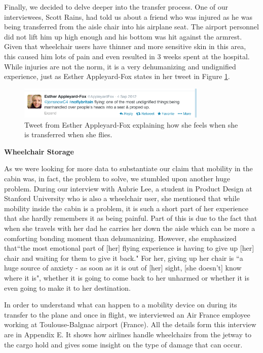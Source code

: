 Finally, we decided to delve deeper into the transfer process. One of our interviewees, Scott Rains, had told us about a friend who was injured as he was being transferred from the aisle chair into his airplane seat. The airport personnel did not lift him up high enough and his bottom was hit against the armrest. Given that wheelchair users have thinner and more sensitive skin in this area, this caused him lots of pain and even resulted in 3 weeks spent at the hospital. While injuries are not the norm, it is a very dehumanizing and undignified experience, just as Esther Appleyard-Fox states in her tweet in Figure \ref{fig:MobilityTweet.png}. 


\begin{figure}[h]
  \centering
     \includegraphics[width=9cm]{images/MobilityTweet.png}
   \caption{Tweet from Esther Appleyard-Fox explaining how she feels when she is transferred when she flies. }
  \label{fig:MobilityTweet.png}
\end{figure}


\textbf{Wheelchair Storage}

As we were looking for more data to substantiate our claim that mobility in the cabin was, in fact, the problem to solve, we stumbled upon another huge problem. During our interview with Aubrie Lee, a student in Product Design at Stanford University who is also a wheelchair user, she mentioned that while mobility inside the cabin is a problem, it is such a short part of her experience that she hardly remembers it as being painful. Part of this is due to the fact that when she travels with her dad he carries her down the aisle which can be more a comforting bonding moment than dehumanizing. However, she emphasized that``the most emotional part of [her] flying experience is having to give up [her] chair and waiting for them to give it back." For her, giving up her chair is ``a huge source of anxiety - as soon as it is out of [her] sight, [she doesn't] know where it is", whether it is going to come back to her unharmed or whether it is even going to make it to her destination. 

In order to understand what can happen to a mobility device on during its transfer to the plane and once in flight, we interviewed an Air France employee working at Toulouse-Balgnac airport (France). All the details form this interview are in Appendix E. It shows how airlines handle wheelchairs from the jetway to the cargo hold and gives some insight on the type of damage that can occur.

